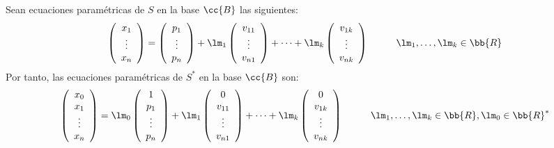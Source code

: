 Sean ecuaciones paramétricas de $S$ en la base $\cc{B}$ las siguientes:
\begin{equation*}
    \left(\begin{array}{c}
        x_1 \\ \vdots \\ x_n
    \end{array}\right)
    = \left(\begin{array}{c}
        p_1 \\ \vdots \\ p_n
    \end{array}\right)
    + \lm_1 \left(\begin{array}{c}
        v_{11} \\ \vdots \\ v_{n1}
    \end{array}\right)
    + \dots
    + \lm_k \left(\begin{array}{c}
        v_{1k} \\ \vdots \\ v_{nk}
    \end{array}\right) \hspace{1cm} \lm_1,\dots,\lm_k \in \bb{R}
\end{equation*}
Por tanto, las ecuaciones paramétricas de $S^\ast$ en la base $\cc{B}$ son:
\begin{equation*}
    \left(\begin{array}{c}
        x_0 \\ x_1 \\ \vdots \\ x_n
    \end{array}\right)
    = \lm_0 \left(\begin{array}{c}
        1 \\ p_1 \\ \vdots \\ p_n
    \end{array}\right)
    + \lm_1 \left(\begin{array}{c}
        0 \\ v_{11} \\ \vdots \\ v_{n1}
    \end{array}\right)
    + \dots
    + \lm_k \left(\begin{array}{c}
        0 \\ v_{1k} \\ \vdots \\ v_{nk}
    \end{array}\right) \hspace{1cm} \lm_1,\dots,\lm_k \in \bb{R}, \lm_0 \in \bb{R}^\ast
\end{equation*}
\vspace{1cm}

